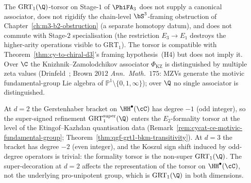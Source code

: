 \begin{remark}
\label{rem:cfg-grt1-torsor-non-rigidifications-d3}
The $\mathrm{GRT}_1(\Q)$-torsor on Stage-$1$ of $\PhiFA_3$ does not supply a canonical associator, does not rigidify the chain-level $\bS^3$-framing obstruction of Chapter~\ref{ch:m3-b2-obstruction} (a separate homotopy datum), and does not commute with Stage-$2$ specialisation (the restriction $E_3 \to E_1$ destroys the higher-arity operations visible to $\mathrm{GRT}_1$). The torsor is compatible with Theorem~\ref{thm:cy-to-chiral-d3}'s framing hypothesis~\textup{(H4)} but does not imply it. Over $\C$ the Knizhnik--Zamolodchikov associator $\Phi_{\mathrm{KZ}}$ is distinguished by multiple zeta values (Drinfeld~\cite{Drinfeld1990}; Brown $2012$ \textit{Ann.~Math.}~$175$: MZVs generate the motivic fundamental-group Lie algebra of $\mathbb{P}^1 \setminus \{0, 1, \infty\}$); over $\Q$ no single associator is distinguished.
\end{remark}

\begin{remark}[$\mathrm{GRT}_1(\Q)$-torsor at $d = 2$ and $d = 3$: the super-refinement]
\label{rem:cfg-grt1-d2-vs-d3}
At $d = 2$ the Gerstenhaber bracket on $\HH^\bullet(\cC)$ has degree $-1$ (odd integer), so the super-signed refinement $\mathrm{GRT}_1^{\mathrm{super}}(\Q)$ enters the $E_2$-formality torsor at the level of the Etingof--Kazhdan quantisation data (Remark~\ref{rem:cycat-ce-motivic-fundamental-group}; Theorem~\ref{thm:qgf-grt1-bkm-transitivity}). At $d = 3$ the bracket has degree $-2$ (even integer), and the Koszul sign shift induced by odd-degree operators is trivial: the formality torsor is the non-super $\mathrm{GRT}_1(\Q)$. The super-decoration at $d = 2$ affects the representation of the torsor on $\HH^\bullet(\cC)$, not the underlying pro-unipotent group, which is $\mathrm{GRT}_1(\Q)$ in both dimensions.
\end{remark}

